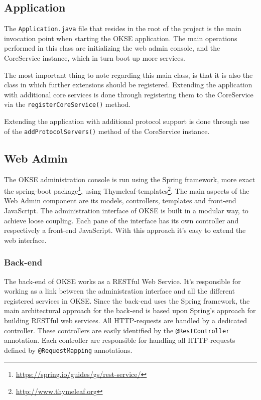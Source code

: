\subsection{Application}

The \verb!Application.java! file that resides in the root of the project is the main invocation point when starting the OKSE application. The main operations performed in this class are initializing the web admin console, and the CoreService instance, which in turn boot up more services.

The most important thing to note regarding this main class, is that it is also the class in which further extensions should be registered. Extending the application with additional core services is done through registering them to the CoreService via the \verb!registerCoreService()! method.

Extending the application with additional protocol support is done through use of the \verb!addProtocolServers()! method of the CoreService instance.

\subsection{Web Admin}

The OKSE administration console is run using the Spring framework, more exact the spring-boot package\footnote{\url{https://spring.io/guides/gs/rest-service/}}, using Thymeleaf-templates\footnote{\url{http://www.thymeleaf.org}}. The main aspects of the Web Admin component are its models, controllers, templates and front-end JavaScript. The administration interface of OKSE is built in a modular way, to achieve loose coupling. Each pane of the interface has its own controller and respectively a front-end JavaScript.  With this approach it's easy to extend the web interface.

\subsubsection{Back-end}

The back-end of OKSE works as a RESTful Web Service. It's responsible for working as a link between the administration interface and all the different registered services in OKSE. Since the back-end uses the Spring framework, the main architectural approach for the back-end is based upon Spring’s approach for building RESTful web services. All HTTP-requests are handled by a dedicated controller. These controllers are easily identified by the \verb!@RestController! annotation. Each controller are responsible for handling all HTTP-requests defined by \verb!@RequestMapping! annotations.  

